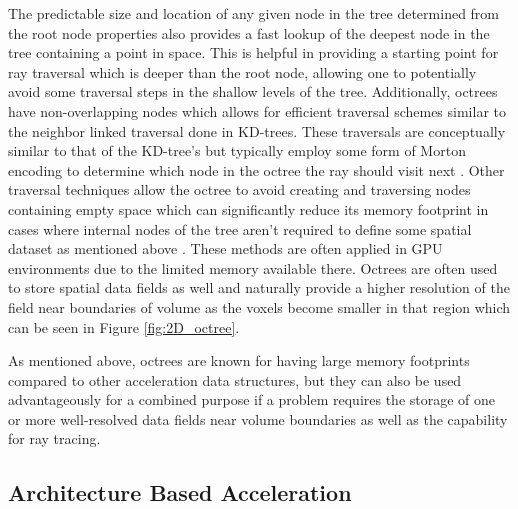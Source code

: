 The predictable size and location of any given node in the tree determined from
the root node properties also provides a fast lookup of the deepest node in the
tree containing a point in space. This is helpful in providing a starting point
for ray traversal which is deeper than the root node, allowing one to
potentially avoid some traversal steps in the shallow levels of the
tree. Additionally, octrees have non-overlapping nodes which allows for
efficient traversal schemes similar to the neighbor linked traversal done in
KD-trees. These traversals are conceptually similar to that of the KD-tree's but
typically employ some form of Morton encoding to determine which node in the
octree the ray should visit next \cite{Revelles_2000}. Other traversal
techniques allow the octree to avoid creating and traversing nodes containing
empty space which can significantly reduce its memory footprint in cases where
internal nodes of the tree aren't required to define some spatial dataset as
mentioned above \cite{Samet_1989}. These methods are often applied in GPU
environments due to the limited memory available there. Octrees are often used
to store spatial data fields as well and naturally provide a higher resolution
of the field near boundaries of volume as the voxels become smaller in that
region which can be seen in Figure \ref{fig:2D_octree}.

As mentioned above, octrees are known for having large memory footprints
compared to other acceleration data structures, but they can also be used
advantageously for a combined purpose if a problem requires the storage of one
or more well-resolved data fields near volume boundaries as well as the
capability for ray tracing.

\subsection{Architecture Based Acceleration}%
\label{subsec:arch}

